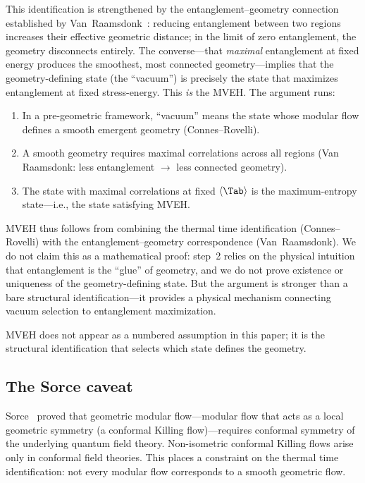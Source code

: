This identification is strengthened by the
entanglement--geometry connection established by
Van~Raamsdonk~\cite{VanRaamsdonk2010}: reducing entanglement between
two regions increases their effective geometric distance; in the limit
of zero entanglement, the geometry disconnects entirely.  The
converse---that \emph{maximal} entanglement at fixed energy produces
the smoothest, most connected geometry---implies that the
geometry-defining state (the ``vacuum'') is precisely the state that
maximizes entanglement at fixed stress-energy.  This \emph{is} the
MVEH.  The argument runs:
\begin{enumerate}
\item In a pre-geometric framework, ``vacuum'' means the state whose
  modular flow defines a smooth emergent geometry (Connes--Rovelli).
\item A smooth geometry requires maximal correlations across all regions
  (Van Raamsdonk: less entanglement $\to$ less connected geometry).
\item The state with maximal correlations at fixed
  $\langle\Tab\rangle$ is the maximum-entropy state---i.e., the state
  satisfying MVEH.
\end{enumerate}
MVEH thus follows from combining the thermal time identification
(Connes--Rovelli) with the entanglement--geometry correspondence
(Van~Raamsdonk).  We do not claim this as a mathematical proof:
step~2 relies on the physical intuition that entanglement is the
``glue'' of geometry, and we do not prove existence or uniqueness of
the geometry-defining state.  But the argument is stronger than a bare
structural identification---it provides a physical mechanism
connecting vacuum selection to entanglement maximization.

MVEH does not appear as a numbered assumption in this paper; it is
the structural identification that selects which state defines the
geometry.

\subsection{The Sorce caveat}
\label{sec:sorce}

Sorce~\cite{Sorce2024} proved that geometric modular flow---modular
flow that acts as a local geometric symmetry (a conformal Killing
flow)---requires conformal symmetry of the underlying quantum field
theory.  Non-isometric conformal Killing flows arise only in conformal
field theories.  This places a constraint on the thermal time
identification: not every modular flow corresponds to a smooth
geometric flow.

